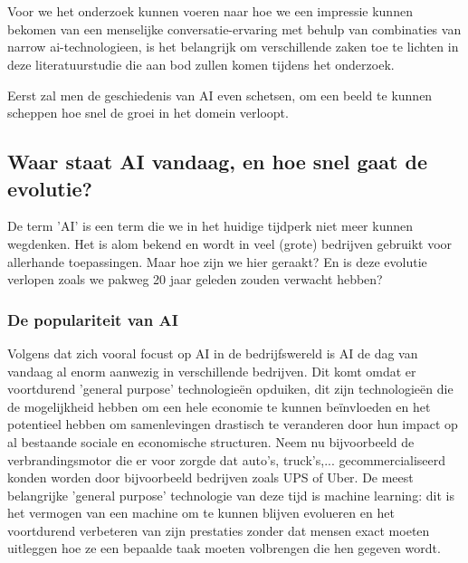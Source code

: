 \chapter{}
\label{ch:literatuurstudie}



Voor we het onderzoek kunnen voeren naar hoe we een impressie kunnen bekomen van een menselijke conversatie-ervaring met behulp van combinaties van narrow ai-technologieen, is het belangrijk om verschillende zaken toe te lichten in deze literatuurstudie die aan bod zullen komen tijdens het onderzoek.

Eerst zal men de geschiedenis van AI even schetsen, om een beeld te kunnen scheppen hoe snel de groei in het domein verloopt.

\section{Waar staat AI vandaag, en hoe snel gaat de evolutie?}
De term 'AI' is een term die we in het huidige tijdperk niet meer kunnen wegdenken. Het is alom bekend en wordt in veel (grote) bedrijven gebruikt voor allerhande toepassingen. Maar hoe zijn we hier geraakt? En is deze evolutie verlopen zoals we pakweg 20 jaar geleden zouden verwacht hebben?

\subsection{De populariteit van AI}
Volgens \cite{brynjolfsson2017artificial} dat zich vooral focust op AI in de bedrijfswereld is AI de dag van vandaag al enorm aanwezig in verschillende bedrijven. Dit komt omdat er voortdurend 'general purpose' technologieën opduiken, dit zijn technologieën die de mogelijkheid hebben om een hele economie te kunnen beïnvloeden en het potentieel hebben om samenlevingen drastisch te veranderen door hun impact op al bestaande sociale en economische structuren. Neem nu bijvoorbeeld de verbrandingsmotor die er voor zorgde dat auto's, truck's,... gecommercialiseerd konden worden door bijvoorbeeld bedrijven zoals UPS of Uber. De meest belangrijke 'general purpose' technologie van deze tijd is machine learning: dit is het vermogen van een machine om te kunnen blijven evolueren en het voortdurend verbeteren van zijn prestaties zonder dat mensen exact moeten uitleggen hoe ze een bepaalde taak moeten volbrengen die hen gegeven wordt. 

